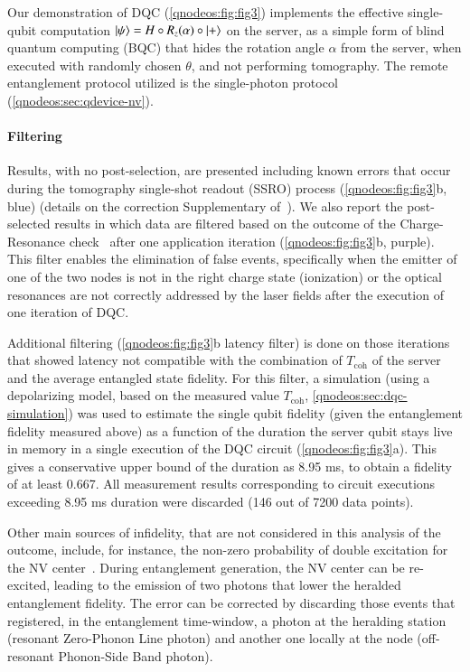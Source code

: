Our demonstration of DQC (\cref{qnodeos:fig:fig3}) implements the effective single-qubit computation $\ket{\psi} = H \circ R_z(\alpha) \circ \ket{+}$ on the server, as a simple form of blind quantum computing (BQC) that hides the rotation angle $\alpha$ from the server, when executed with randomly chosen $\theta$, and not performing tomography.
The remote entanglement protocol utilized is the single-photon protocol~\cite{cabrillo1999creation,bose1999proposal,hermans2023entangling} (\cref{qnodeos:sec:qdevice-nv}).

\paragraph{Filtering}

Results, with no post-selection, are presented including known errors that occur during the tomography single-shot readout (SSRO) process (\cref{qnodeos:fig:fig3}b, blue) (details on the correction Supplementary of~\cite{pompili_2021_multinode}).
We also report the post-selected results in which data are filtered based on the outcome of the Charge-Resonance check~\cite{robledo2010control} after one application iteration (\cref{qnodeos:fig:fig3}b, purple).
This filter enables the elimination of false events, specifically when the emitter of one of the two nodes is not in the right charge state (ionization) or the optical resonances are not correctly addressed by the laser fields after the execution of one iteration of DQC.

Additional filtering (\cref{qnodeos:fig:fig3}b latency filter) is done on those iterations that showed latency not compatible with the combination of $T_{\text{coh}}$ of the server and the average entangled state fidelity.
For this filter, a simulation (using a depolarizing model, based on the measured value $T_{\text{coh}}$, \cref{qnodeos:sec:dqc-simulation}) was used to estimate the single qubit fidelity (given the entanglement fidelity measured above) as a function of the duration the server qubit stays live in memory in a single execution of the DQC circuit (\cref{qnodeos:fig:fig3}a).
This gives a conservative upper bound of the duration as 8.95 ms, to obtain a fidelity of at least 0.667.
All measurement results corresponding to circuit executions exceeding 8.95 ms duration were discarded (146 out of 7200 data points). 

Other main sources of infidelity, that are not considered in this analysis of the outcome, include, for instance, the non-zero probability of double excitation for the NV center~\cite{hermans2023entangling}.
During entanglement generation, the NV center can be re-excited, leading to the emission of two photons that lower the heralded entanglement fidelity.
The error can be corrected by discarding those events that registered, in the entanglement time-window, a photon at the heralding station (resonant Zero-Phonon Line photon) and another one locally at the node (off-resonant Phonon-Side Band photon). 

